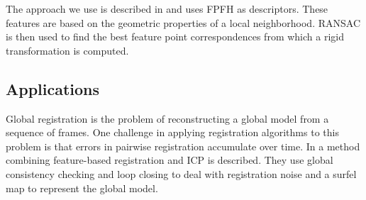 \documentclass[a4paper]{article}
\begin{document}
The approach we use is described in \cite{rusu2009fast} and uses \ac{FPFH} as descriptors. These features are based on the geometric properties of a local neighborhood. \ac{RANSAC} is then used to find the best feature point correspondences from which a rigid transformation is computed.



\subsection{Applications}

Global registration is the problem of reconstructing a global model from a sequence of frames. %
One challenge in applying registration algorithms to this problem is that errors in pairwise registration accumulate over time. In \cite{henry2010rgb} a method combining feature-based registration and \ac{ICP} is described. They use global consistency checking and loop closing to deal with registration noise and a surfel map to represent the global model.




\end{document}
